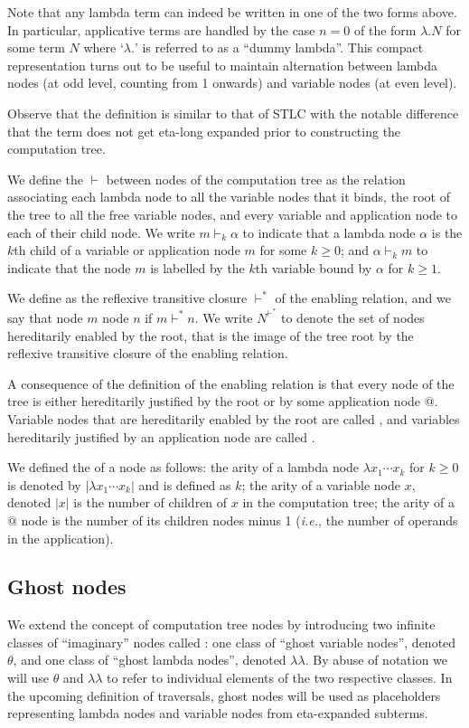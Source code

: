 \documentclass{article}
\makeatletter
\theoremstyle{definition}
\newcommand\Nodes{N}%
\newcommand{\ghostlmd}{{\lambda\!\!\lambda}}
\newcommand{\ghostvar}{\theta}
\newcommand{\enables}{\vdash} %
\newcommand{\NodeHjByRoot}{\Nodes^{\enables^*}} %
\renewcommand\ie{{\it i.e.\@\xspace}}
\makeatother
\begin{document}
Note that any lambda term can indeed be written in one of the two forms above. In particular, applicative terms are handled by the case $n=0$ of the form $\lambda . N$ for some term $N$ where `$\lambda.$' is referred to as a ``dummy lambda''. This compact representation turns out to be useful to maintain alternation between lambda nodes (at odd level, counting from 1 onwards) and variable nodes (at even level).

Observe that the definition is similar to that of STLC \cite{Ong2006, BlumPhd} with the notable difference that the term does not get eta-long expanded prior to constructing the computation tree.

We define the  $\enables$ between nodes of the computation tree as the relation associating each lambda node to all the variable nodes that it binds, the root of the tree to all the free variable nodes, and every variable and application node to each of their child node. We write $m \enables_k \alpha$ to indicate that a lambda node $\alpha$ is the $k$th child of a variable or application node $m$ for some $k\geq0$; and $\alpha \enables_k m$ to indicate that the node $m$ is labelled by the $k$th variable bound by $\alpha$ for $k\geq1$.

We define  as the reflexive transitive closure $\enables^*$ of the enabling relation, and we say that node $m$  node $n$ if $m \enables^* n$. We write $\NodeHjByRoot$ to denote the set of nodes hereditarily enabled by the root, that is the image of the tree root by the reflexive transitive closure of the enabling relation.

A consequence of the definition of the enabling relation is that every node of the tree is either hereditarily justified by the root or by some application node $@$.  Variable nodes that are hereditarily enabled by the root are called , and variables hereditarily justified by an application node are called .

We defined the  of a node as follows: the arity of a lambda node $\lambda x_1 \cdots x_k$ for $k\geq 0$ is denoted by $|\lambda x_1 \cdots x_k|$ and is defined as $k$; the arity of a variable node $x$, denoted $|x|$ is the number of children of $x$ in the computation tree; the arity of a $@$ node is the number of its children nodes minus 1 (\ie, the number of operands in the application).

\subsection{Ghost nodes}
We extend the concept of computation tree nodes by introducing two infinite classes of ``imaginary'' nodes called :
one class of ``ghost variable nodes'', denoted $\ghostvar$, and one class of ``ghost lambda nodes'', denoted $\ghostlmd$. By abuse of notation we will use $\ghostvar$ and $\ghostlmd$ to refer to individual elements of the two respective classes. In the upcoming definition of traversals, ghost nodes will be used as placeholders representing lambda nodes and variable nodes from eta-expanded subterms.
\end{document}
